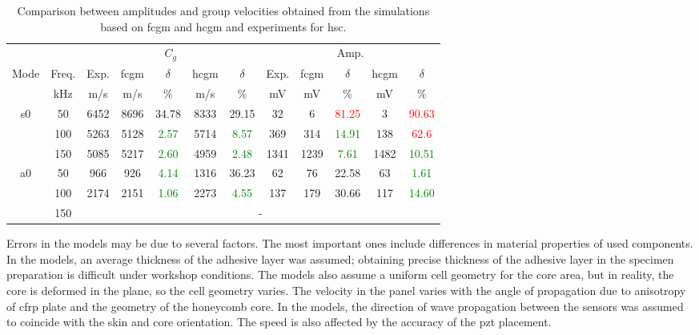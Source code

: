 \begin{table}[!htb]
	\small
	\tabcolsep=0.15cm
	\centering
	\caption{\label{tab:group_velocity_hsc} Comparison between amplitudes and group velocities obtained from the simulations based on \acf{fcgm} and \acf{hcgm} and experiments for \acf{hsc}.}
	\begin{tabular}{cccccccccccc}
		\toprule
		& & \multicolumn{5}{c}{\(C_g\)} & \multicolumn{5}{c}{Amp.}\\
		\multirow{2}{*}{Mode} & Freq.& Exp. & \ac{fcgm} & \(\delta\) & \ac{hcgm} & \(\delta\) &  Exp. & \ac{fcgm} & \(\delta\) & \ac{hcgm} & \(\delta\)\\
		& \unit{\kHz} & \unit[per-mode = symbol]{\m\per\s} & \unit[per-mode = symbol]{\m\per\s} & \% & \unit[per-mode = symbol]{\m\per\s} & \% & \unit{\mV} & \unit{\mV} & \%& \unit{\mV} & \% \\
		\midrule
		\multirow{3}{*}{\ac{s0}} & 50 & 6452 & 8696 & {34.78} & 8333 & {29.15} & 32 & 6 & \textcolor{red}{81.25} & 3 & \textcolor{red}{90.63}\\
		&100& 5263 & 5128 & \textcolor{green}{2.57} & 5714 & \textcolor{green}{8.57} & 369 & 314 & \textcolor{green}{14.91} & 138 & \textcolor{red}{62.6}\\
		&150& 5085 & 5217 & \textcolor{green}{2.60} & 4959 & \textcolor{green}{2.48} & 1341 & 1239 & \textcolor{green}{7.61} & 1482 & \textcolor{green}{10.51}\\
		\midrule
		\multirow{3}{*}{\ac{a0}} & 50 & 966 & 926 & \textcolor{green}{4.14} & 1316 & {36.23} & 62 & 76 & {22.58} & 63 & \textcolor{green}{1.61}\\
		& 100 & 2174 & 2151 & \textcolor{green}{1.06} & 2273 & \textcolor{green}{4.55} & 137 & 179 & {30.66} & 117 & \textcolor{green}{14.60}\\
		& 150 & \multicolumn{10}{c}{-}\\
		\bottomrule
	\end{tabular}
\end{table}
Errors in the models may be due to several factors.
The most important ones include differences in material properties of used components.
In the models, an average thickness of the adhesive layer was assumed; obtaining precise thickness of the adhesive layer in the specimen preparation is difficult under workshop conditions.
The models also assume a uniform cell geometry for the core area, but in reality, the core is deformed in the plane, so the cell geometry varies.
The velocity in the panel varies with the angle of propagation due to anisotropy of \ac{cfrp} plate and the geometry of the honeycomb core.
In the models, the direction of wave propagation between the sensors was assumed to coincide with the skin and core orientation.
The speed is also affected by the accuracy of the \ac{pzt} placement.